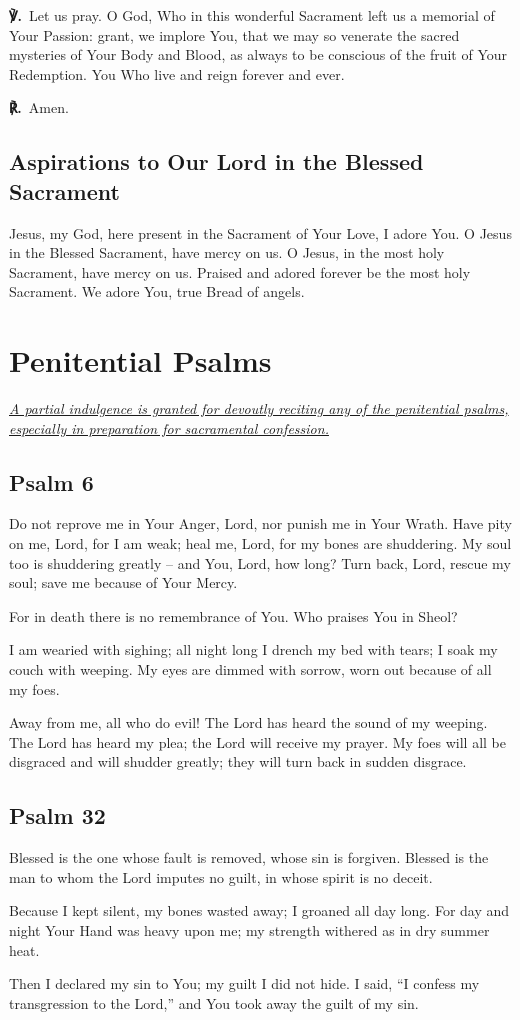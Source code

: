 \documentclass[12pt]{article}
\makeatletter
\newcommand{\prayersection}[1]{\section{#1}}
\newcommand{\prayertitle}[1]{\subsection{#1}}
\newcommand{\indulgencedprayertitle}[1]{\prayertitle{#1 \protect\kreuz}}
\newcommand{\emphasis}[1]{\emph{#1}}
\newcommand{\emphasis}[1]{\textsl{#1}}
\newcommand{\note}[1]{{\small{\emphasis{#1}}}\newline}
\newcommand{\linkednote}[2]{\hyperlink{#1}{\note{#2}}}
\newcommand{\versicle}{{\setmainfont{Times New Roman}\textbf{℣.}}\xspace}
\newcommand{\response}{{\setmainfont{Times New Roman}\textbf{℟.}}\xspace}
\DeclareRobustCommand{\versicle}{\textbf{\vers@resp{-0.1em}{V}.}\xspace}
\DeclareRobustCommand{\response}{\textbf{\vers@resp{0pt}{R}.}\xspace}
\newcommand{\vers@resp@sym}{\raisebox{0.2ex}{\rotatebox[origin=c]{-20}{$\m@th\rceil$}}}
\newcommand{\vers@resp}[2]{%
		{\ooalign{\hidewidth\kern#1\vers@resp@sym\hidewidth\cr#2\cr}}%
	}
\makeatother
\begin{document}
\versicle\ Let us pray.
O God, Who in this wonderful Sacrament left us a memorial of Your Passion:
grant, we implore You, that we may so venerate the sacred mysteries of Your Body and Blood, as always to be conscious of the fruit of Your Redemption.
You Who live and reign forever and ever.

\response\ Amen.

\prayertitle{Aspirations to Our Lord in the Blessed Sacrament}
Jesus, my God, here present in the Sacrament of Your Love, I adore You. 
O Jesus in the Blessed Sacrament, have mercy on us. 
O Jesus, in the most holy Sacrament, have mercy on us. 
Praised and adored forever be the most holy Sacrament. 
We adore You, true Bread of angels. 

\newpage

\prayersection{Penitential Psalms}
\linkednote{grant9}{A partial indulgence is granted for devoutly reciting any of the penitential psalms, especially in preparation for sacramental confession.}
\indulgencedprayertitle{Psalm 6}
Do not reprove me in Your Anger, Lord,
nor punish me in Your Wrath.
Have pity on me, Lord, for I am weak;
heal me, Lord, for my bones are shuddering.
My soul too is shuddering greatly -- and You, Lord, how long?
Turn back, Lord, rescue my soul;
save me because of Your Mercy.

For in death there is no remembrance of You.
Who praises You in Sheol?

I am wearied with sighing;
all night long I drench my bed with tears;
I soak my couch with weeping.
My eyes are dimmed with sorrow, worn out because of all my foes.

Away from me, all who do evil!
The Lord has heard the sound of my weeping.
The Lord has heard my plea;
the Lord will receive my prayer.
My foes will all be disgraced and will shudder greatly;
they will turn back in sudden disgrace.

\indulgencedprayertitle{Psalm 32}
Blessed is the one whose fault is removed, whose sin is forgiven.
Blessed is the man to whom the Lord imputes no guilt, in whose spirit is no deceit.

Because I kept silent, my bones wasted away;
I groaned all day long.
For day and night Your Hand was heavy upon me;
my strength withered as in dry summer heat.

Then I declared my sin to You;
my guilt I did not hide.
I said, ``I confess my transgression to the Lord,'' and You took away the guilt of my sin.
\end{document}
